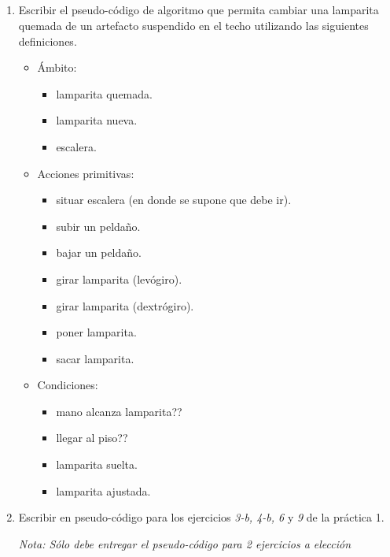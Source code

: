 \documentclass[a4paper,10pt]{article}
\begin{document}
~\\ \\ \\ \\

\begin{enumerate}
\item Escribir el pseudo-c\'odigo de algoritmo que permita cambiar una lamparita quemada  de un artefacto suspendido en el techo utilizando las siguientes definiciones.
    \begin{itemize}
        \item \'Ambito:
            \begin{itemize}
                \item[-] lamparita quemada.
                \item[-] lamparita nueva.
                \item[-] escalera.
            \end{itemize}
        \item Acciones primitivas:
            \begin{itemize}
                \item[-] situar escalera (en donde se supone que debe ir).
                \item[-] subir un pelda\~no.
                \item[-] bajar un pelda\~no.
                \item[-] girar lamparita (lev\'ogiro).
                \item[-] girar lamparita (dextr\'ogiro).
                \item[-] poner lamparita.
                \item[-] sacar lamparita.
            \end{itemize}
        \item Condiciones:
            \begin{itemize}
                \item[-] mano alcanza lamparita??
                \item[-] llegar al piso??
                \item[-] lamparita suelta.
                \item[-] lamparita ajustada.
            \end{itemize}
    \end{itemize}

\item Escribir en pseudo-c\'odigo para los ejercicios \emph{3-b, 4-b, 6} y \emph{9} de la pr\'actica 1.
\begin{small} \textit{Nota: S\'olo debe entregar el pseudo-c\'odigo para 2 ejercicios a elecci\'on} \end{small}


\end{enumerate}
\end{document}
